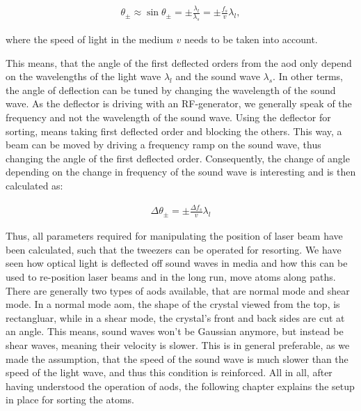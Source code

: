 \begin{figure}[t]
\end{figure}

\begin{align}
	\theta_\pm \approx \sin \theta_\pm = \pm \frac{\lambda_l}{\lambda_s} = \pm \frac{f_s}{v} \lambda_l,
\end{align}

where the speed of light in the medium $v$ needs to be taken into account.

This means, that the angle of the first deflected orders from the \ac{aod} only depend on the wavelengths of the light wave $\lambda_l$ and the sound wave $\lambda_s$. In other terms, the angle of deflection can be tuned by changing the wavelength of the sound wave. As the deflector is driving with an RF-generator, we generally speak of the frequency and not the wavelength of the sound wave. Using the deflector for sorting, means taking first deflected order and blocking the others.
This way, a beam can be moved by driving a frequency ramp on the sound wave, thus changing the angle of the first deflected order. Consequently, the change of angle depending on the change in frequency of the sound wave is interesting and is then calculated as:

\begin{align}
	\Delta\theta_\pm = \pm \frac {\Delta f_s}{v} \lambda_l
\end{align}%
\label{eq:aod_angle}

Thus, all parameters required for manipulating the position of laser beam have been calculated, such that the tweezers can be operated for resorting. We have seen how optical light is deflected off sound waves in media and how this can be used to re-position laser beams and in the long run, move atoms along paths. There are generally two types of \acp{aod} available, that are normal mode and shear mode. In a normal mode \ac{aom}, the shape of the crystal viewed from the top, is rectangluar, while in a shear mode, the crystal's front and back sides are cut at an angle. This means, sound waves won't be Gaussian anymore, but instead be shear waves, meaning their velocity is slower. This is in general preferable, as we made the assumption, that the speed of the sound wave is much slower than the speed of the light wave, and thus this condition is reinforced. All in all, after having understood the operation of \acp{aod}, the following chapter explains the setup in place for sorting the atoms.


